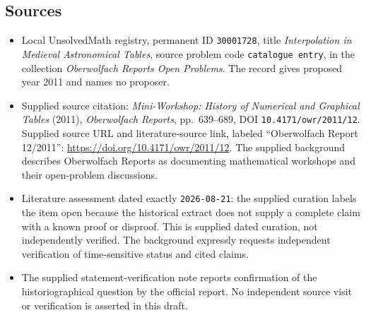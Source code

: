 \documentclass[11pt]{article}
\begin{document}
\subsection{Sources}
\begin{itemize}
\item Local UnsolvedMath registry, permanent ID \texttt{30001728}, title \emph{Interpolation in Medieval Astronomical Tables}, source problem code \texttt{catalogue entry}, in the collection \emph{Oberwolfach Reports Open Problems}. The record gives proposed year 2011 and names no proposer.
\item Supplied source citation: \emph{Mini-Workshop: History of Numerical and Graphical Tables} (2011), \emph{Oberwolfach Reports}, pp.~639--689, DOI \texttt{10.4171/owr/2011/12}. Supplied source URL and literature-source link, labeled ``Oberwolfach Report 12/2011'': \url{https://doi.org/10.4171/owr/2011/12}. The supplied background describes Oberwolfach Reports as documenting mathematical workshops and their open-problem discussions.
\item Literature assessment dated exactly \texttt{2026-08-21}: the supplied curation labels the item open because the historical extract does not supply a complete claim with a known proof or disproof. This is supplied dated curation, not independently verified. The background expressly requests independent verification of time-sensitive status and cited claims.
\item The supplied statement-verification note reports confirmation of the historiographical question by the official report. No independent source visit or verification is asserted in this draft.
\end{itemize}
\end{document}
